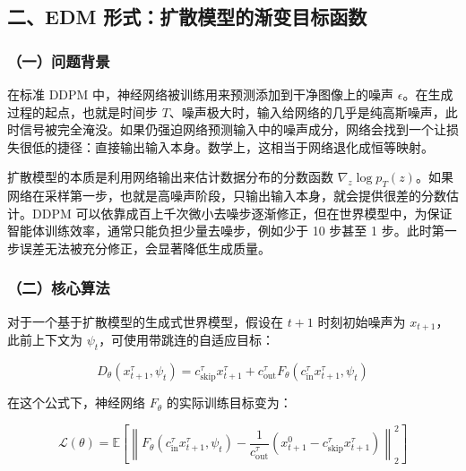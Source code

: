 \hypertarget{ux4e8cedm-ux5f62ux5f0fux6269ux6563ux6a21ux578bux7684ux6e10ux53d8ux76eeux6807ux51fdux6570}{%
\subsection{二、EDM 形式：扩散模型的渐变目标函数}\label{ux4e8cedm-ux5f62ux5f0fux6269ux6563ux6a21ux578bux7684ux6e10ux53d8ux76eeux6807ux51fdux6570}}

\hypertarget{ux4e00ux95eeux9898ux80ccux666f-4}{%
\subsubsection{（一）问题背景}\label{ux4e00ux95eeux9898ux80ccux666f-4}}

在标准 DDPM 中，神经网络被训练用来预测添加到干净图像上的噪声 \(\epsilon\)。在生成过程的起点，也就是时间步 \(T\)、噪声极大时，输入给网络的几乎是纯高斯噪声，此时信号被完全淹没。如果仍强迫网络预测输入中的噪声成分，网络会找到一个让损失很低的捷径：直接输出输入本身。数学上，这相当于网络退化成恒等映射。

扩散模型的本质是利用网络输出来估计数据分布的分数函数 \(\nabla_z\log p_T(z)\)。如果网络在采样第一步，也就是高噪声阶段，只输出输入本身，就会提供很差的分数估计。DDPM 可以依靠成百上千次微小去噪步逐渐修正，但在世界模型中，为保证智能体训练效率，通常只能负担少量去噪步，例如少于 10 步甚至 1 步。此时第一步误差无法被充分修正，会显著降低生成质量。

\hypertarget{ux4e8cux6838ux5fc3ux7b97ux6cd5}{%
\subsubsection{（二）核心算法}\label{ux4e8cux6838ux5fc3ux7b97ux6cd5}}

对于一个基于扩散模型的生成式世界模型，假设在 \(t+1\) 时刻初始噪声为 \(x_{t+1}\)，此前上下文为 \(\psi_t\)，可使用带跳连的自适应目标：

\[
D_\theta(x_{t+1}^{\tau},\psi_t)
=c_{\mathrm{skip}}^\tau x_{t+1}^{\tau}
+c_{\mathrm{out}}^\tau F_\theta(c_{\mathrm{in}}^\tau x_{t+1}^{\tau},\psi_t)
\]

在这个公式下，神经网络 \(F_\theta\) 的实际训练目标变为：

\[
\mathcal{L}(\theta)=
\mathbb{E}\left[
\left\|
F_\theta(c_{\mathrm{in}}^\tau x_{t+1}^{\tau},\psi_t) -
\frac{1}{c_{\mathrm{out}}^\tau}
\left(x_{t+1}^{0}-c_{\mathrm{skip}}^\tau x_{t+1}^{\tau}\right)
\right\|_2^2
\right]
\]


